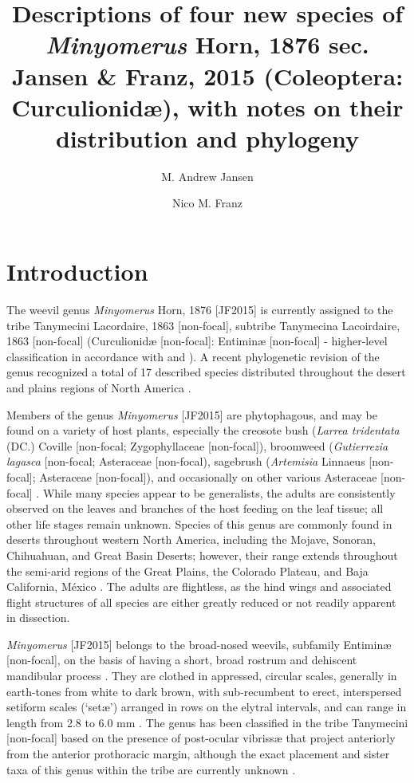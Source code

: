 \documentclass[fleqn,10pt,lineno]{wlpeerj} %
\title{Descriptions of four new species of \textit{Minyomerus} Horn, 1876 sec. Jansen \& Franz, 2015 (Coleoptera: Curculionid{\ae}), with notes on their distribution and phylogeny}
\author[1]{M. Andrew Jansen}
\author[2]{Nico M. Franz}
\affil[1]{School of Life Sciences, 427 E Tyler Mall, PO Box 874501, Tempe, AZ 85287}
\affil[2]{ASU Natural History Collections, 734 W Alameda Dr, Tempe, AZ 85282}
\begin{document}
\flushbottom
\maketitle
\thispagestyle{empty}

\section*{Introduction}\label{sec:intro}
	The weevil genus \textit{Minyomerus} Horn, 1876 [JF2015] is currently assigned to the tribe Tanymecini Lacordaire, 1863 [non-focal], subtribe Tanymecina Lacoirdaire, 1863 [non-focal] (Curculionid{\ae} [non-focal]: Entimin{\ae} [non-focal] - higher-level classification in accordance with \citealt{alonso1999} and \citealt{bouchard2011}). 
	A recent phylogenetic revision of the genus recognized a total of 17 described species distributed throughout the desert and plains regions of North America \citep{jansen2015}.
	
	Members of the genus \textit{Minyomerus} [JF2015] are phytophagous, and may be found on a variety of host plants, especially the creosote bush (\textit{Larrea tridentata} (DC.) Coville [non-focal; Zygophyllaceae [non-focal]), broomweed (\textit{Gutierrezia lagasca} [non-focal; Asteraceae [non-focal), sagebrush (\textit{Artemisia} Linnaeus [non-focal]; Asteraceae [non-focal]), and occasionally on other various Asteraceae [non-focal] \citep{jansen2015}. 
	While many species appear to be generalists, the adults are consistently observed on the leaves and branches of the host feeding on the leaf tissue; all other life stages remain unknown.
	Species of this genus are commonly found in deserts throughout western North America, including the Mojave, Sonoran, Chihuahuan, and Great Basin Deserts; however, their range extends throughout the semi-arid regions of the Great Plains, the Colorado Plateau, and Baja California, M\'{e}xico \citep{obrien1982, jansen2015}. 
	The adults are flightless, as the hind wings and associated flight structures of all species are either greatly reduced or not readily apparent in dissection.
		
	\textit{Minyomerus} [JF2015] belongs to the broad-nosed weevils, subfamily Entimin{\ae} [non-focal], on the basis of having a short, broad rostrum and dehiscent mandibular process \citep{marvaldi1997, anderson2002, oberprieler2007, oberprieler2014, marvaldi2014}.
	They are clothed in appressed, circular scales, generally in earth-tones from white to dark brown, with sub-recumbent to erect, interspersed setiform scales (`set{\ae}') arranged in rows on the elytral intervals, and can range in length from 2.8 to 6.0 mm \citep{jansen2015}.
	The genus has been classified in the tribe Tanymecini [non-focal] based on the presence of post-ocular vibriss{\ae} that project anteriorly from the anterior prothoracic margin, although the exact placement and sister taxa of this genus within the tribe are currently unknown \citep{howden1959, howden1970, howden1982, jansen2015}.
		
\end{document}
